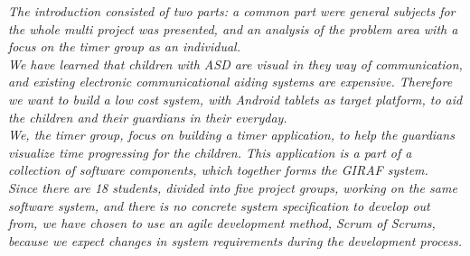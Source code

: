 \textit{The introduction consisted of two parts: a common part were general subjects for the whole multi project was presented, and an analysis of the problem area with a focus on the timer group as an individual.}\\

\textit{We have learned that children with ASD are visual in they way of communication, and existing electronic communicational aiding systems are expensive.
Therefore we want to build a low cost system, with Android tablets as target platform, to aid the children and their guardians in their everyday.}\\

\textit{We, the timer group, focus on building a timer application, to help the guardians visualize time progressing for the children.
This application is a part of a collection of software components, which together forms the GIRAF system.}\\

\textit{Since there are 18 students, divided into five project groups, working on the same software system, and there is no concrete system specification to develop out from, we have chosen to use an agile development method, Scrum of Scrums, because we expect changes in system requirements during the development process.}